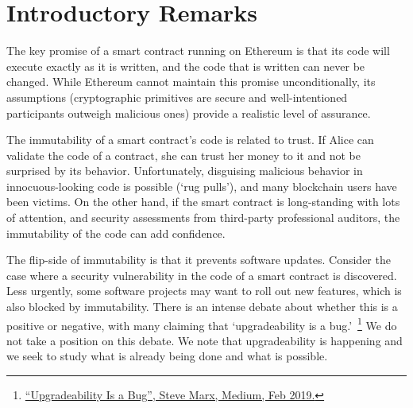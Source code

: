 

\section{Introductory Remarks}

The key promise of a smart contract running on Ethereum is that its code will execute exactly as it is written, and the code that is written can never be changed. While Ethereum cannot maintain this promise unconditionally, its assumptions (\eg cryptographic primitives are secure and well-intentioned participants outweigh malicious ones) provide a realistic level of assurance. 

The immutability of a smart contract's code is related to trust. If Alice can validate the code of a contract, she can trust her money to it and not be surprised by its behavior. Unfortunately, disguising malicious behavior in innocuous-looking code is possible (`rug pulls'), and many blockchain users have been victims. On the other hand, if the smart contract is long-standing with lots of attention, and security assessments from third-party professional auditors, the immutability of the code can add confidence. 

The flip-side of immutability is that it prevents software updates. Consider the case where a security vulnerability in the code of a smart contract is discovered. Less urgently, some software projects may want to roll out new features, which is also blocked by immutability. There is an intense debate about whether this is a positive or negative, with many claiming that `upgradeability is a bug.'~\footnote{\href{https://medium.com/consensys-diligence/upgradeability-is-a-bug-dba0203152ce}{``Upgradeability Is a Bug'', Steve Marx, Medium, Feb 2019.}} We do not take a position on this debate. We note that upgradeability is happening and we seek to study what is already being done and what is possible. 

